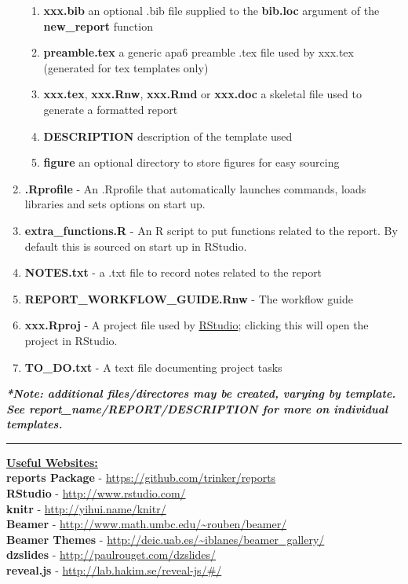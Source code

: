 \documentclass{article}\usepackage{graphicx, color}
\begin{document}
\begin{enumerate}
\begin{enumerate}
    \item \textbf{xxx.bib} an optional .bib file supplied to the \textbf{bib.loc} argument of the \textbf{new\_report} function
    \item \textbf{preamble.tex} a generic apa6 preamble .tex file used by xxx.tex (generated for tex templates only) 
    \item \textbf{xxx.tex}, \textbf{xxx.Rnw}, \textbf{xxx.Rmd} or \textbf{xxx.doc} a skeletal file used to generate a formatted report
    \item \textbf{DESCRIPTION} description of the template used
    \item \textbf{figure} an optional directory to store figures for easy sourcing
  \end{enumerate} 
  \item \textbf{.Rprofile} - An .Rprofile that automatically launches commands, loads libraries and sets options on start up.
  \item \textbf{extra\_functions.R} - An R script to put functions related to the report.  By default this is sourced on start up in RStudio.  
  \item \textbf{NOTES.txt} - a .txt file to record notes related to the report
  \item \textbf{REPORT\_WORKFLOW\_GUIDE.Rnw} - The workflow guide
  \item \textbf{xxx.Rproj} - A project file used by \href{http://www.rstudio.com/}{RStudio}; clicking this will open the project in RStudio. 
  \item \textbf{TO\_DO.txt} - A text file documenting project tasks
\end{enumerate}
\vspace{1.5 mm}
{\scriptsize \textbf{\emph{*Note: additional files/directores may be created, varying by template. See \texttildelow report\_name/REPORT/DESCRIPTION for more on individual templates.}}}
\vspace{3 mm}
\hrule
\vspace{3 mm}
\noindent \textbf{\underline{Useful Websites:}} \vspace{1.5 mm} \\ 
\textbf{reports Package} - \href{https://github.com/trinker/reports}{https://github.com/trinker/reports}\\ 
\textbf{RStudio} - \href{http://www.rstudio.com/}{http://www.rstudio.com/}\\
\textbf{knitr} - \href{http://yihui.name/knitr/}{http://yihui.name/knitr/}\\
\textbf{Beamer} - \url{http://www.math.umbc.edu/~rouben/beamer/}\\
\textbf{Beamer Themes} - \url{http://deic.uab.es/~iblanes/beamer_gallery/}\\
\textbf{dzslides} - \url{http://paulrouget.com/dzslides/}\\
\textbf{reveal.js} - \url{http://lab.hakim.se/reveal-js/#/}\\
\end{document}
